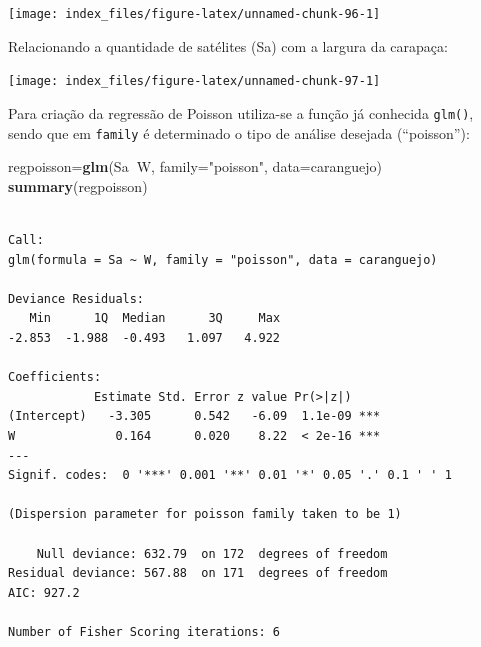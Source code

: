 \documentclass[12pt,brazil,oneside]{book}
\newenvironment{Shaded}{\begin{snugshade}}{\end{snugshade}}
\newcommand{\DataTypeTok}[1]{\textcolor[rgb]{0.13,0.29,0.53}{#1}}
\newcommand{\KeywordTok}[1]{\textcolor[rgb]{0.13,0.29,0.53}{\textbf{#1}}}
\newcommand{\NormalTok}[1]{#1}
\newcommand{\OperatorTok}[1]{\textcolor[rgb]{0.81,0.36,0.00}{\textbf{#1}}}
\newcommand{\StringTok}[1]{\textcolor[rgb]{0.31,0.60,0.02}{#1}}
\begin{document}
\begin{center}\texttt{[image: index\_files/figure-latex/unnamed-chunk-96-1]} \end{center}

Relacionando a quantidade de satélites (Sa) com a largura da carapaça:

\begin{Shaded}
\end{Shaded}

\begin{center}\texttt{[image: index\_files/figure-latex/unnamed-chunk-97-1]} \end{center}

Para criação da regressão de Poisson utiliza-se a função já conhecida \texttt{glm()}, sendo que em \texttt{family} é determinado o tipo de análise desejada (``poisson''):

\begin{Shaded}
\begin{Highlighting}[]
\NormalTok{regpoisson=}\KeywordTok{glm}\NormalTok{(Sa}\OperatorTok{~}\NormalTok{W, }\DataTypeTok{family=}\StringTok{"poisson"}\NormalTok{, }\DataTypeTok{data=}\NormalTok{caranguejo)}
\KeywordTok{summary}\NormalTok{(regpoisson)}
\end{Highlighting}
\end{Shaded}

\begin{verbatim}

Call:
glm(formula = Sa ~ W, family = "poisson", data = caranguejo)

Deviance Residuals: 
   Min      1Q  Median      3Q     Max  
-2.853  -1.988  -0.493   1.097   4.922  

Coefficients:
            Estimate Std. Error z value Pr(>|z|)    
(Intercept)   -3.305      0.542   -6.09  1.1e-09 ***
W              0.164      0.020    8.22  < 2e-16 ***
---
Signif. codes:  0 '***' 0.001 '**' 0.01 '*' 0.05 '.' 0.1 ' ' 1

(Dispersion parameter for poisson family taken to be 1)

    Null deviance: 632.79  on 172  degrees of freedom
Residual deviance: 567.88  on 171  degrees of freedom
AIC: 927.2

Number of Fisher Scoring iterations: 6
\end{verbatim}
\end{document}
